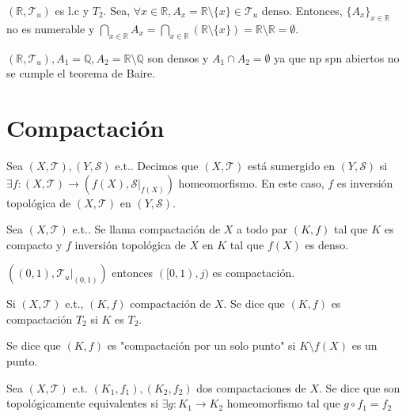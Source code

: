 \begin{ejm}
  $( \mathbb{R}, \mathcal{T}_{u} )$ es l.c y $T_{2}$. Sea, $\forall x \in \mathbb{R}, A_{x} = \mathbb{R} \setminus \{ x \} \in \mathcal{T}_{u}$ denso. Entonces, $\{ A_{x} \}_{x \in \mathbb{R}}$ no es numerable y $\bigcap_{x \in \mathbb{R}} A_{x} = \bigcap_{x \in \mathbb{R}}( \mathbb{R} \setminus \{ x \}) = \mathbb{R} \setminus \mathbb{R} = \emptyset$.
\end{ejm}

\begin{ejm}
  $( \mathbb{R}, \mathcal{T}_{u} ), A_{1} = \mathbb{Q}, A_{2} = \mathbb{R} \setminus \mathbb{Q}$ son densos y $ A_{1} \cap A_{2} = \emptyset$ ya que np spn abiertos no se cumple el teorema de Baire.
\end{ejm}

\section{Compactación}

\begin{defn}
  Sea $( X, \mathcal{T} ), ( Y, \mathcal{S} )$ e.t.. Decimos que $( X, \mathcal{T} )$ está sumergido en $( Y, \mathcal{S} )$ si $\exists f :  ( X, \mathcal{T} ) \to ( f(X), \mathcal{S}|_{f(X)})$ homeomorfismo. En este caso, $f$ es inversión topológica de $( X, \mathcal{T} )$ en $( Y, \mathcal{S} )$.
\end{defn}

\begin{defn}[Compactación]
  Sea $( X, \mathcal{T} )$ e.t.. Se llama compactación de $X$ a todo par $(K, f)$ tal que $ K$ es compacto y $f$ inversión topológica de $X$ en $K$ tal que $f(X)$ es denso.
\end{defn}

\begin{ejm}
  $( (0, 1), \mathcal{T}_{u}|_{(0, 1)})$ entonces $( [0, 1), j )$ es compactación.
\end{ejm}

\begin{defn}[Compactación $T_2$]
  Si $( X, \mathcal{T} )$ e.t., $( K, f )$ compactación de $X$. Se dice que $( K, f )$ es compactación $T_{2}$ si $K$ es $T_{2}$.

  Se dice que $( K, f )$ es "compactación por un solo punto" si $K \setminus f(X)$ es un punto.
\end{defn}

\begin{defn}
  Sea $( X, \mathcal{T} )$ e.t. $( K_{1}, f_{1} ), ( K_{2}, f_{2} )$ dos compactaciones de $X$. Se dice que son topológicamente equivalentes si $\exists g : K_{1} \to K_{2}$ homeomorfismo tal que $g \circ f_{1} = f_{2}$
\end{defn}


